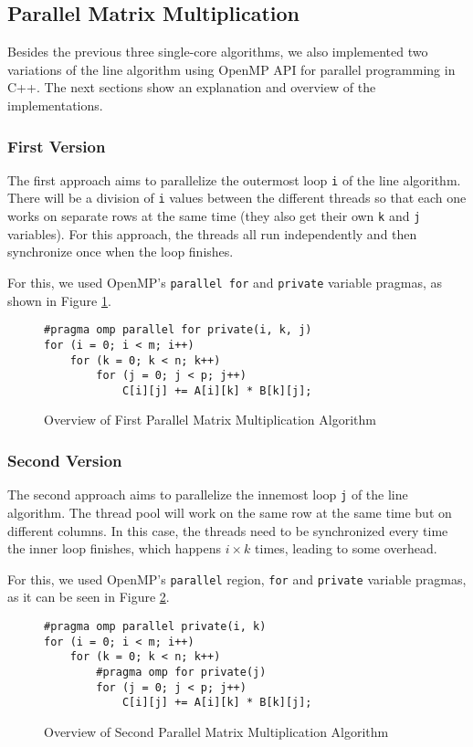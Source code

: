 \subsection{Parallel Matrix Multiplication}

Besides the previous three single-core algorithms, we also implemented two variations of the line algorithm using OpenMP API for parallel programming in C++. The next sections show an explanation and overview of the implementations.

\subsubsection{First Version}

The first approach aims to parallelize the outermost loop \verb#i# of the line algorithm. There will be a division of \verb#i# values between the different threads so that each one works on separate rows at the same time (they also get their own \verb#k# and \verb#j# variables). For this approach, the threads all run independently and then synchronize once when the loop finishes.

For this, we used OpenMP's \verb#parallel for# and \verb#private# variable pragmas, as shown in Figure \ref{fig:algo:parallel1}.

\begin{figure}[ht!]
\begin{verbatim}
#pragma omp parallel for private(i, k, j)
for (i = 0; i < m; i++)
    for (k = 0; k < n; k++)
        for (j = 0; j < p; j++)
            C[i][j] += A[i][k] * B[k][j];
\end{verbatim}
\caption{Overview of First Parallel Matrix Multiplication Algorithm}
\label{fig:algo:parallel1}
\end{figure}

\subsubsection{Second Version}

The second approach aims to parallelize the innemost loop \verb#j# of the line algorithm. The thread pool will work on the same row at the same time but on different columns. In this case, the threads need to be synchronized every time the inner loop finishes, which happens $i\times k$ times, leading to some overhead.

For this, we used OpenMP's \verb#parallel# region, \verb#for# and \verb#private# variable pragmas, as it can be seen in Figure \ref{fig:algo:parallel2}.

\begin{figure}[ht!]
\begin{verbatim}
#pragma omp parallel private(i, k)
for (i = 0; i < m; i++)
    for (k = 0; k < n; k++)
        #pragma omp for private(j)
        for (j = 0; j < p; j++)
            C[i][j] += A[i][k] * B[k][j];
\end{verbatim}
\caption{Overview of Second Parallel Matrix Multiplication Algorithm}
\label{fig:algo:parallel2}
\end{figure}
